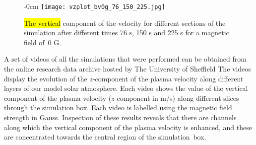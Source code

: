 \documentclass[physics,article,accept,pdftex,moreauthors]{Definitions/mdpi}
\begin{document}
\begin{figure}[H]
\begin{adjustwidth}{-\extralength}{0cm}
\centering %
\texttt{[image: vzplot\_bv0g\_76\_150\_225.jpg]}
\end{adjustwidth}
\caption{\hl{The vertical} %
 component of the velocity for different sections of the simulation after different times 76 s, 150 s and 225 s for a magnetic field of~0 G.\label{fig6}}
\end{figure}


A set of videos of all the simulations that were performed can be obtained from the online research data archive hosted by The University of 
Sheffield %
 The videos display the evolution of the $z$-component of the plasma velocity along different layers of our model solar atmosphere. Each video shows the value of the vertical component of the plasma velocity ($z$-component in m/s) along different slices through the simulation box. Each video is labelled using the magnetic field strength in Gauss. Inspection of these results reveals that there are channels along which the vertical component of the plasma velocity is enhanced, and these are concentrated towards the central region of the simulation~box.



 
  
\end{document}
